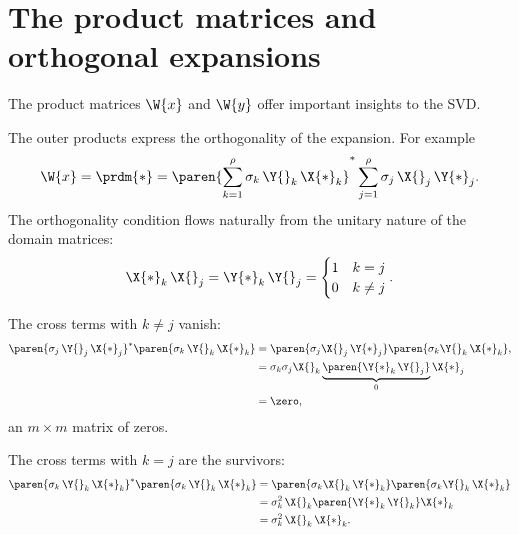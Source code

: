 \section{The product matrices and orthogonal expansions}

The product matrices $\W{x}$ and $\W{y}$ offer important insights to the SVD.

The outer products express the orthogonality of the expansion. For example
\begin{equation}
  \begin{split}
    \W{x} = \prdm{*} = \paren{\sum_{k=1}^{\rho}{\sigma_{k}\, \Y{}_{k}\, \X{*}_{k}}}^{*}\sum_{j=1}^{\rho}{\sigma_{j}\, \X{}_{j}\, \Y{*}_{j}}.
  \end{split}
\end{equation}
The orthogonality condition flows naturally from the unitary nature of the domain matrices:
\begin{equation}
  \X{*}_{k}\,\X{}_{j} = \Y{*}_{k}\,\Y{}_{j} =
  \begin{cases}
    1 & k = j\\
    0 & k \ne j
  \end{cases}.
\end{equation}

The cross terms with $k\ne j$ vanish:
\begin{equation}
  \begin{split}
    \paren{\sigma_{j}\, \Y{}_{j}\, \X{*}_{j}}^{*}\paren{\sigma_{k}\, \Y{}_{k}\, \X{*}_{k}} &= \paren{\sigma_{j}\X{}_{j}\, \Y{*}_{j}}\paren{\sigma_{k}\Y{}_{k}\, \X{*}_{k}}, \\
    &= \sigma_{k}\sigma_{j}\X{}_{k}\underbrace{\paren{\Y{*}_{k}\,\Y{}_{j}}}_{0}\X{*}_{j}\\
    & = \zero,
  \end{split}
\end{equation}
an $m\times m$ matrix of zeros.

The cross terms with $k=j$ are the survivors:
\begin{equation}
  \begin{split}
    \paren{\sigma_{k}\, \Y{}_{k}\, \X{*}_{k}}^{*}\paren{\sigma_{k}\, \Y{}_{k}\, \X{*}_{k}}&= \paren{\sigma_{k}\X{}_{k}\, \Y{*}_{k}}\paren{\sigma_{k}\Y{}_{k}\, \X{*}_{k}} \\
    &= \sigma_{k}^{2}\,\X{}_{k}\paren{\Y{*}_{k}\,\Y{}_{k}}\X{*}_{k}\\
    &= \sigma_{k}^{2}\,\X{}_{k}\,\X{*}_{k}.
  \end{split}
\end{equation}

